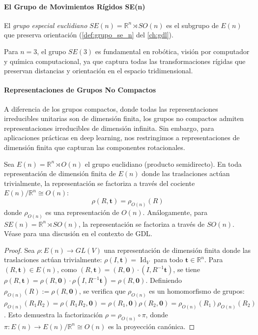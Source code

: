 \paragraph{El Grupo de Movimientos Rígidos SE(n)}

El \textit{grupo especial euclidiano} $SE(n) = \mathbb{R}^n \rtimes SO(n)$ es el subgrupo de $E(n)$ que preserva orientación (\autoref{def:grupo_se_n} del \autoref{ch:gdl}).\label{def:grupo_se_n_cnn}

Para $n = 3$, el grupo $SE(3)$ es fundamental en robótica, visión por computador y química computacional, ya que captura todas las transformaciones rígidas que preservan distancias y orientación en el espacio tridimensional.

\paragraph{Representaciones de Grupos No Compactos}

A diferencia de los grupos compactos, donde todas las representaciones irreducibles unitarias son de dimensión finita, los grupos no compactos admiten representaciones irreducibles de dimensión infinita. Sin embargo, para aplicaciones prácticas en deep learning, nos restringimos a representaciones de dimensión finita que capturan las componentes rotacionales.

\begin{proposition}\label{prop:descomp_repr_en}
Sea $E(n) = \mathbb{R}^n \rtimes O(n)$ el grupo euclidiano (producto semidirecto). En toda representación de dimensión finita de $E(n)$ donde las traslaciones actúan trivialmente, la representación se factoriza a través del cociente $E(n)/\mathbb{R}^n \cong O(n)$:
\begin{equation}
\rho(R, \mathbf{t}) = \rho_{O(n)}(R)
\end{equation}
donde $\rho_{O(n)}$ es una representación de $O(n)$. Análogamente, para $SE(n) = \mathbb{R}^n \rtimes SO(n)$, la representación se factoriza a través de $SO(n)$. Véase \citep{DBLP:journals/corr/abs-2104-13478} para una discusión en el contexto de GDL.
\end{proposition}

\begin{proof}
Sea $\rho: E(n) \to GL(V)$ una representación de dimensión finita donde las traslaciones actúan trivialmente: $\rho(I, \mathbf{t}) = \operatorname{Id}_V$ para todo $\mathbf{t} \in \mathbb{R}^n$. Para $(R, \mathbf{t}) \in E(n)$, como $(R, \mathbf{t}) = (R, \mathbf{0}) \cdot (I, R^{-1}\mathbf{t})$, se tiene $\rho(R, \mathbf{t}) = \rho(R, \mathbf{0}) \cdot \rho(I, R^{-1}\mathbf{t}) = \rho(R, \mathbf{0})$. Definiendo $\rho_{O(n)}(R) := \rho(R, \mathbf{0})$, se verifica que $\rho_{O(n)}$ es un homomorfismo de grupos: $\rho_{O(n)}(R_1 R_2) = \rho(R_1 R_2, \mathbf{0}) = \rho(R_1, \mathbf{0}) \rho(R_2, \mathbf{0}) = \rho_{O(n)}(R_1) \rho_{O(n)}(R_2)$. Esto demuestra la factorización $\rho = \rho_{O(n)} \circ \pi$, donde $\pi: E(n) \to E(n)/\mathbb{R}^n \cong O(n)$ es la proyección canónica.
\end{proof}

